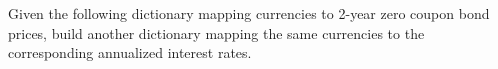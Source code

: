 \begin{Exercise}
Given the following dictionary mapping currencies to 2-year zero coupon
bond prices, build another dictionary mapping the same currencies to the
corresponding annualized interest rates.

\begin{Shaded}
\begin{Highlighting}[]
\OperatorTok{=}\NormalTok{ \{}
\NormalTok{: }\NormalTok{,}
\NormalTok{: }\NormalTok{,}
\NormalTok{: }\NormalTok{,}
\NormalTok{: }
\NormalTok{\}}
\end{Highlighting}
\end{Shaded}
\end{Exercise}

